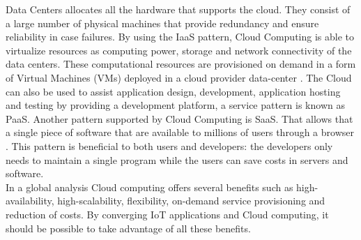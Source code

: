 Data Centers allocates all the hardware that supports the cloud. They consist of
a large number of physical machines that provide redundancy and ensure reliability
in case failures. By using the IaaS pattern, Cloud Computing is able to virtualize
resources as computing power, storage and network connectivity of the data centers.
These computational resources are provisioned on demand in a form of Virtual Machines (VMs)
deployed in a cloud provider data-center \cite{sotomayor2009virtual}. The Cloud can also
be used to assist application design, development, application hosting and testing by providing
a development platform, a service pattern is known as PaaS. Another pattern supported by
Cloud Computing is SaaS. That allows that a single piece of software that are available
to millions of users through a browser \cite{zhang2010cloud}. This pattern is beneficial to both users
and developers: the developers only needs to maintain a single program while the users can
save costs in servers and software.\\

In a global analysis Cloud computing offers several benefits such as high-availability,
high-scalability, flexibility, on-demand service provisioning and reduction of costs.
By converging IoT applications and Cloud computing, it should be possible to take advantage
of all these benefits.
